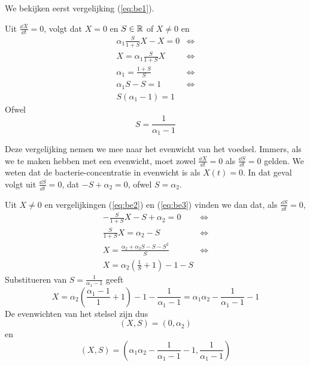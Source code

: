We bekijken eerst vergelijking (\ref{eq:be1}).

Uit $\tfrac{\dd X}{\dd t} = 0$, volgt dat $X = 0$ en $S\in\mathbb{R}$ of $X \neq 0$ en
\begin{align*}
	\alpha_1 \frac{S}{1 + S} X - X = 0 &\iff \\
	X = \alpha_1 \frac{S}{1 + S}X &\iff \\
	\alpha_1 = \frac{1 + S}{S} &\iff \\
	\alpha_1S-S = 1 &\iff \\
	S(\alpha_1-1) = 1
\end{align*}
Ofwel
\begin{equation}
S=\frac{1}{\alpha_1-1}												\label{eq:be3}
\end{equation}

Deze vergelijking nemen we mee naar het evenwicht van het voedsel. Immers, als we te maken hebben met een evenwicht, moet zowel $\tfrac{\dd X}{\dd t} = 0$ als $\tfrac{\dd S}{ \dd t } = 0$ gelden. We weten dat de bacterie-concentratie in evenwicht is als $X(t) = 0$. In dat geval volgt uit $\tfrac{\dd S}{\dd t} = 0$, dat $-S+\alpha_2=0$, ofwel $S = \alpha_2$.

Uit $X\neq0$ en vergelijkingen (\ref{eq:be2}) en (\ref{eq:be3}) vinden we dan dat, als $\tfrac{\dd S}{\dd t} = 0$,
\begin{align*}
	- \frac{S}{1 + S}X - S + \alpha_2 = 0 		&\iff \\
	\frac{S}{1 + S}X = \alpha_2 - S 			&\iff \\
	X = \frac{\alpha_2 + \alpha_2 S - S - S^2}{S} &\iff \\
	X = \alpha_2 \left( \frac{1}{S} + 1 \right) - 1 - S
\end{align*}
Substitueren van $S = \frac{1}{\alpha_1-1}$ geeft
\begin{equation}
	X = \alpha_2 \left( \frac{\alpha_1 - 1}{1} + 1 \right) - 1 - \frac{1}{\alpha_1 - 1} = \alpha_1\alpha_2 - \frac{1}{\alpha_1 - 1} - 1
\end{equation}
De evenwichten van het stelsel zijn dus
\[(X,S) = (0, \alpha_2)\]
en
\[(X,S) = (\alpha_1\alpha_2 - \frac{1}{\alpha_1 - 1} - 1, \frac{1}{\alpha_1-1})\]


